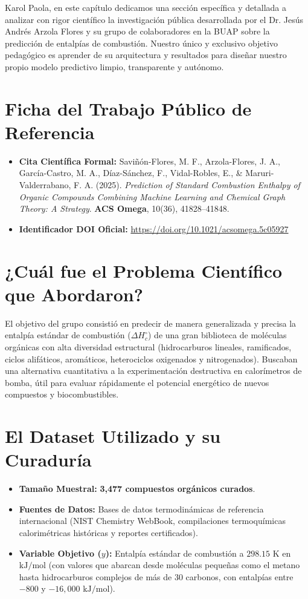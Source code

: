 \documentclass[11pt,letterpaper]{report}
\begin{document}
Karol Paola, en este capítulo dedicamos una sección específica y detallada a analizar con rigor científico la investigación pública desarrollada por el Dr. Jesús Andrés Arzola Flores y su grupo de colaboradores en la BUAP sobre la predicción de entalpías de combustión. Nuestro único y exclusivo objetivo pedagógico es aprender de su arquitectura y resultados para diseñar nuestro propio modelo predictivo limpio, transparente y autónomo.

\section{Ficha del Trabajo Público de Referencia}
\begin{itemize}[leftmargin=*]
    \item \textbf{Cita Científica Formal:} Saviñón-Flores, M. F., Arzola-Flores, J. A., García-Castro, M. A., Díaz-Sánchez, F., Vidal-Robles, E., \& Maruri-Valderrabano, F. A. (2025). \textit{Prediction of Standard Combustion Enthalpy of Organic Compounds Combining Machine Learning and Chemical Graph Theory: A Strategy}. \textbf{ACS Omega}, 10(36), 41828--41848.
    \item \textbf{Identificador DOI Oficial:} \url{https://doi.org/10.1021/acsomega.5c05927}
\end{itemize}

\section{¿Cuál fue el Problema Científico que Abordaron?}
El objetivo del grupo consistió en predecir de manera generalizada y precisa la entalpía estándar de combustión ($\Delta H_c^\circ$) de una gran biblioteca de moléculas orgánicas con alta diversidad estructural (hidrocarburos lineales, ramificados, ciclos alifáticos, aromáticos, heterociclos oxigenados y nitrogenados). Buscaban una alternativa cuantitativa a la experimentación destructiva en calorímetros de bomba, útil para evaluar rápidamente el potencial energético de nuevos compuestos y biocombustibles.

\section{El Dataset Utilizado y su Curaduría}
\begin{itemize}[leftmargin=*]
    \item \textbf{Tamaño Muestral:} \textbf{3,477 compuestos orgánicos curados}.
    \item \textbf{Fuentes de Datos:} Bases de datos termodinámicas de referencia internacional (NIST Chemistry WebBook, compilaciones termoquímicas calorimétricas históricas y reportes certificados).
    \item \textbf{Variable Objetivo ($y$):} Entalpía estándar de combustión a $298.15\text{ K}$ en $\text{kJ/mol}$ (con valores que abarcan desde moléculas pequeñas como el metano hasta hidrocarburos complejos de más de 30 carbonos, con entalpías entre $-800$ y $-16,000\text{ kJ/mol}$).
\end{itemize}
\end{document}

